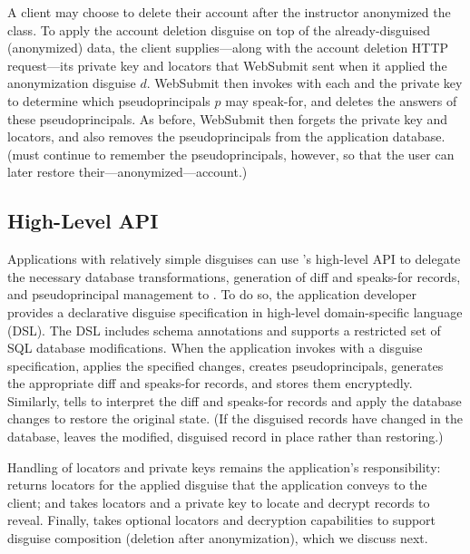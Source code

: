 %
A client may choose to delete their account after the instructor anonymized the
class.
%
To apply the account deletion disguise on top of the already-disguised (anonymized)
data, the client supplies---along with the account deletion HTTP request---its
private key and locators  that WebSubmit sent when it applied the
anonymization disguise $d$.
%
WebSubmit then invokes  with each  and the private
key to determine which pseudoprincipals $p$ may speak-for, and deletes the answers
of these pseudoprincipals.
%
As before, WebSubmit then forgets the private key and locators, and also removes
the pseudoprincipals from the application database.
%
(\sys must continue to remember the pseudoprincipals, however, so that the user
can later restore their---anonymized---account.)
%

\subsection{High-Level API}
\label{s:api-high}

%
Applications with relatively simple disguises can use \sys's high-level API to
delegate the necessary database transformations, generation of diff and speaks-for
records, and pseudoprincipal management to \sys.
%
To do so, the application developer provides a declarative disguise specification in
\sys high-level domain-specific language (DSL).
%
The DSL includes schema annotations and supports a restricted set of SQL database
modifications.
%
When the application invokes  with a disguise specification, \sys
applies the specified changes, creates pseudoprincipals, generates the appropriate
diff and speaks-for records, and stores them encryptedly.
%
Similarly,  tells \sys to interpret the diff and speaks-for
records and apply the database changes to restore the original state.
%
(If the disguised records have changed in the database, \sys leaves the modified,
disguised record in place rather than restoring.)
%

%
Handling of locators and private keys remains the application's responsibility:
 returns locators for the applied disguise that the
application conveys to the client; and  takes locators and a
private key to locate and decrypt records to reveal.
%
Finally,  takes optional locators and decryption capabilities
to support disguise composition (\eg deletion after anonymization), which
we discuss next.
%
